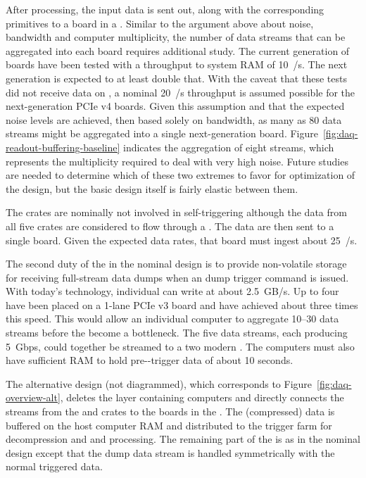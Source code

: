 After processing, the input data is sent out, along with the
corresponding primitives to a  board in a . 
Similar to the argument above about noise, bandwidth and  computer
multiplicity, the number of  data streams that can be aggregated
into each  board requires additional study. 
The current generation of  boards have been tested with a
throughput to system RAM of \SI{10}{\GB/\s}. 
The next generation is expected to at least double that. 
With the caveat that these tests did not receive data on , a nominal
\SI{20}{\GB/\s} throughput is assumed possible for the next-generation
PCIe v4 boards. 
Given this assumption and that the expected noise levels are achieved,
then based solely on bandwidth, as many as \num{80}  data streams might be
aggregated into a single next-generation  board. 
Figure~\ref{fig:daq-readout-buffering-baseline} indicates the
aggregation of eight  streams, which represents the multiplicity
required to deal with very high noise. 
Future studies are needed to determine %
which of these two extremes to favor for optimization of the design,
but the basic design itself is
fairly elastic between them.

The  crates are nominally not involved in self-triggering although
the data from all five  crates are considered 
 to flow through a  . 
The data are then sent to a
single  board. 
Given the expected data rates, that  board must ingest about
\SI{25}{\GB/\s}.

The second duty of the  in the nominal design is to
provide non-volatile storage for receiving full-stream data dumps when
an  dump trigger command is issued. 
With today's technology, individual  can write at about \SI{2.5}{GB/s}. 
Up to four  have been placed on a \num{1}-lane PCIe v3 board and have
achieved about three times this speed. 
This would allow an individual  computer to aggregate \numrange{10}{30} 
data streams before the  become a bottleneck. 
The five  data streams, each producing \SI{5}{Gbps}, could together be
streamed to a two modern . 
The  computers must also have sufficient RAM to hold
pre--trigger data of about \num{10} seconds.

The alternative design (not diagrammed), which corresponds to
Figure~\ref{fig:daq-overview-alt}, deletes the layer containing 
computers and directly connects the  streams from the  and 
crates to the  boards in the . 
The  (compressed) data is buffered on the  host computer RAM
and distributed to the trigger farm for decompression and  and  processing. 
The remaining part of the  is as in the nominal
design except that the  dump data stream is handled symmetrically
with the normal triggered data.

